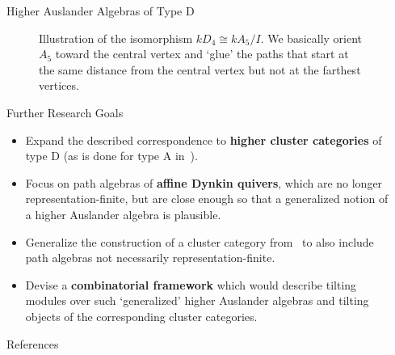 \documentclass[final]{beamer}
\newlength{\sepwidth}
\newlength{\colwidth}
\newcommand{\separatorcolumn}{\begin{column}{\sepwidth}\end{column}}
\begin{document}
\begin{frame}[t]
\begin{columns}[t]
\begin{column}{\colwidth}
\begin{alertblock}{Higher Auslander Algebras of Type D}
\begin{figure}[ht]
   \caption{Illustration of the isomorphism $kD_4 \cong kA_5 / I$. We basically
    orient $A_5$ toward the central vertex and `glue' the paths that start at the
    same distance from the central vertex but not at the farthest vertices.}
   \label{fig:D4-A5}
  \end{figure}
 \end{alertblock}
  \begin{block}{Further Research Goals}
   \begin{itemize}
    \item Expand the described correspondence to \textbf{higher cluster
     categories} of type D (as is done for type A in~\cite[Section 6]{ot}).
    \item Focus on path algebras of \textbf{affine Dynkin quivers}, which are no
     longer representation-finite, but are close enough so that a generalized
     notion of a higher Auslander algebra is plausible.
    \item Generalize the construction of a cluster category from~\cite[Section
     5]{ot} to also include path algebras not necessarily representation-finite.
    \item Devise a \textbf{combinatorial framework} which would describe tilting modules
     over such `generalized' higher Auslander algebras and tilting objects of
     the corresponding cluster categories.
   \end{itemize}
  \end{block}

  \begin{block}{References}

    \nocite{*}
    \footnotesize{}

  \end{block}

\end{column}

\separatorcolumn
\end{columns}
\end{frame}
\end{document}
